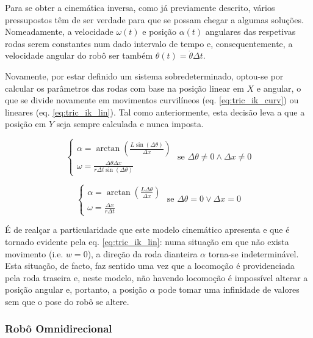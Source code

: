 \documentclass{article}
\begin{document}
Para se obter a cinemática inversa, como já previamente descrito, vários pressupostos têm de ser verdade para que se possam chegar a algumas soluções. Nomeadamente, a velocidade $\omega (t)$ e posição $\alpha (t)$ angulares das respetivas rodas serem constantes num dado intervalo de tempo e, consequentemente, a velocidade angular do robô ser também $\theta (t) = \dot{\theta} \Delta t$. 

Novamente, por estar definido um sistema sobredeterminado, optou-se por calcular os parâmetros das rodas com base na posição linear em $X$ e angular, o que se divide novamente em movimentos curvilíneos (eq. \ref{eq:tric_ik_curv}) ou lineares (eq. \ref{eq:tric_ik_lin}). Tal como anteriormente, esta decisão leva a que a posição em $Y$ seja sempre calculada e nunca imposta.

\begin{equation}
    \begin{cases}
        \alpha = \arctan\left(\frac{L \sin{\left(\Delta \theta \right)}}{\Delta x} \right) \\
        \omega = \frac{\Delta \theta \Delta x}{r \Delta t \sin{\left(\Delta \theta \right)}}
    \end{cases}
    \text{ se } \Delta \theta \neq 0 \wedge \Delta x \neq 0
    \label{eq:tric_ik_curv}
\end{equation}

\begin{equation}
    \begin{cases}
        \alpha = \arctan \left( \frac{L \Delta \theta}{\Delta x} \right) \\
        \omega  = \frac{\Delta x}{r \Delta t}
    \end{cases}
    \text{ se } \Delta \theta = 0 \vee \Delta x = 0
    \label{eq:tric_ik_lin}
\end{equation}

É de realçar a particularidade que este modelo cinemático apresenta e que é tornado evidente pela eq. \ref{eq:tric_ik_lin}: numa situação em que não exista movimento (i.e. $w = 0$), a direção da roda dianteira $\alpha$ torna-se indeterminável. Esta situação, de facto, faz sentido uma vez que a locomoção é providenciada pela roda traseira e, neste modelo, não havendo locomoção é impossível alterar a posição angular e, portanto, a posição $\alpha$ pode tomar uma infinidade de valores sem que o pose do robô se altere.

\subsubsection{Robô Omnidirecional}
\end{document}
